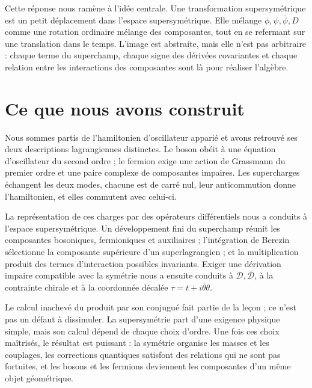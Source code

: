 Cette réponse nous ramène à l’idée centrale. Une transformation supersymétrique est un petit déplacement dans l’espace supersymétrique. Elle mélange \(\phi,\psi,\bar\psi,D\) comme une rotation ordinaire mélange des composantes, tout en se refermant sur une translation dans le temps. L’image est abstraite, mais elle n’est pas arbitraire : chaque terme du superchamp, chaque signe des dérivées covariantes et chaque relation entre les interactions des composantes sont là pour réaliser l’algèbre.

\section{Ce que nous avons construit}

Nous sommes partis de l’hamiltonien d’oscillateur apparié et avons retrouvé ses deux descriptions lagrangiennes distinctes. Le boson obéit à une équation d’oscillateur du second ordre ; le fermion exige une action de Grassmann du premier ordre et une paire complexe de composantes impaires. Les supercharges échangent les deux modes, chacune est de carré nul, leur anticommution donne l’hamiltonien, et elles commutent avec celui-ci.

La représentation de ces charges par des opérateurs différentiels nous a conduits à l’espace supersymétrique. Un développement fini du superchamp réunit les composantes bosoniques, fermioniques et auxiliaires ; l’intégration de Berezin sélectionne la composante supérieure d’un superlagrangien ; et la multiplication produit des termes d’interaction possibles invariants. Exiger une dérivation impaire compatible avec la symétrie nous a ensuite conduits à \(\mathcal D,\bar{\mathcal D}\), à la contrainte chirale et à la coordonnée décalée \(\tau=t+i\bar\theta\theta\).

Le calcul inachevé du produit par son conjugué fait partie de la leçon ; ce n’est pas un défaut à dissimuler. La supersymétrie part d’une exigence physique simple, mais son calcul dépend de chaque choix d’ordre. Une fois ces choix maîtrisés, le résultat est puissant : la symétrie organise les masses et les couplages, les corrections quantiques satisfont des relations qui ne sont pas fortuites, et les bosons et les fermions deviennent les composantes d’un même objet géométrique.
